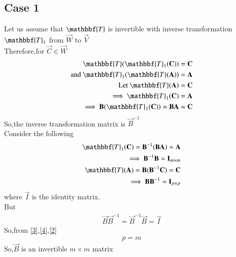 \documentclass[journal,12pt,twocolumn]{IEEEtran}
\begin{document}
\subsection{Case 1}
Let us assume that $\mathbbf{T}$ is invertible with inverse transformation $\mathbbf{T}_1$ from $\vec{W}$ to $\vec{V}$\\
Therefore,for $\vec{C} \in \vec{W}$ 
\begin{align}
\mathbbf{T}(\mathbbf{T}_1(\vec{C}))=\vec{C}\\
\text{and  }\mathbbf{T}_1(\mathbbf{T}(\vec{A}))=\vec{A}\\
\text{Let }\mathbbf{T}(\vec{A})=\vec{C}\\
\implies \mathbbf{T}_1(\vec{C})=\vec{A}\\
\implies \vec{B}(\mathbbf{T}_1(\vec{C}))=\vec{B}\vec{A}=\vec{C}
\end{align}
So,the inverse transformation matrix is $\vec{B}^{-1}$\\
Consider the following
\begin{align}
  \mathbbf{T}_1(\vec{C})=\vec{B}^{-1}(\vec{B}\vec{A})=\vec{A}\\
  \implies \vec{B}^{-1}\vec{B}=\vec{I}_{m \times m}\label{3}\\
  \mathbbf{T}(\vec{A})=\vec{B}(\vec{B}^{-1}\vec{C})=\vec{C}\\
  \implies \vec{B}\vec{B}^{-1}=\vec{I}_{p \times p}\label{4}
\end{align}
where $\vec{I}$ is the identity matrix.\\
But
\begin{align}
    \vec{B}\vec{B}^{-1}=\vec{B}^{-1}\vec{B}=\vec{I}\label{2}
\end{align}
 So,from \eqref{3},\eqref{4},\eqref{2} 
\begin{align}
    p=m
\end{align}
So,$\vec{B}$ is an invertible $m \times m$ matrix
\end{document}
